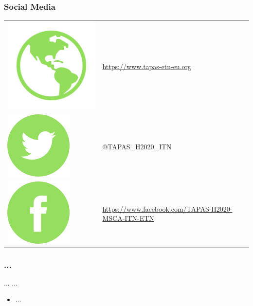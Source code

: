 \documentclass{beamer}
\begin{document}
\begin{frame}
\frametitle{Social Media}
\small
\begin{tabular}{ll}
\hspace{-0.1cm}\includegraphics[scale=0.4]{img/website.png} & \url{https://www.tapas-etn-eu.org}\vspace{0.3cm}\\ 
\includegraphics{img/twitter.png} & @TAPAS\_H2020\_ITN\vspace{0.4cm}\\
\includegraphics{img/facebook.png} & \url{https://www.facebook.com/TAPAS-H2020-MSCA-ITN-ETN}
\end{tabular}
\end{frame}

\begin{frame} 
\frametitle{...} 
\begin{block}{...}
...
\end{block} 
\begin{itemize} 
\item ...
\end{itemize}
\end{frame}
\end{document}
